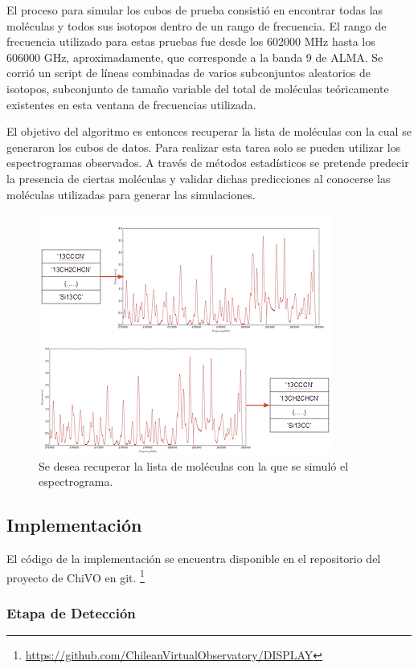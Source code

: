 El proceso para simular los cubos de prueba consistió en encontrar todas las moléculas y todos sus isotopos dentro de un rango de frecuencia. El rango de frecuencia utilizado para estas pruebas fue desde los 602000 MHz hasta los 606000 GHz, aproximadamente, que corresponde a la banda 9 de ALMA. Se corrió un script de líneas combinadas de varios subconjuntos aleatorios de isotopos, subconjunto de tamaño variable del total de moléculas teóricamente existentes en esta ventana de frecuencias utilizada.

El objetivo del algoritmo es entonces recuperar la lista de moléculas con la cual se generaron los cubos de datos. Para realizar esta tarea solo se pueden utilizar los espectrogramas observados. A través de métodos estadísticos se pretende predecir la presencia de ciertas moléculas y validar dichas predicciones al conocerse las moléculas utilizadas para generar las simulaciones.


\begin{figure}[H]
	\begin{center}
		\includegraphics{images/fig0}
		\caption{Se desea recuperar la lista de moléculas con la que se simuló el espectrograma. }
	\end{center}
\end{figure}



\subsection{Implementación}

El código de la implementación se encuentra disponible en el repositorio del proyecto de ChiVO en git. \footnote{\url{https://github.com/ChileanVirtualObservatory/DISPLAY}}

\subsubsection{Etapa de Detección}


